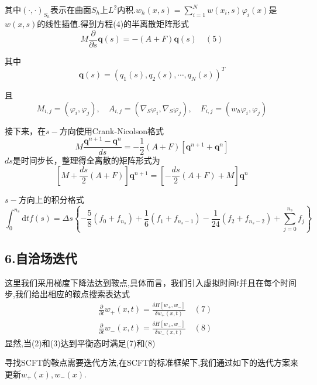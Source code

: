 \documentclass{article}
\begin{document}
其中$(\cdot,\cdot)_{S_h}$表示在曲面$S_h$上$L^2$内积.$w_h(x,s)=\sum\limits_{i=1}^Nw(x_i,s)\varphi_i(x)$是$w(x,s)$的线性插值.得到方程(4)的半离散矩阵形式
\begin{equation*}
M\frac{\partial}{\partial s}\boldsymbol{q}(s)=-(A+F)\boldsymbol{q}(s)\quad(5)
\end{equation*}

其中
\begin{equation*}
\boldsymbol{q}(s)=(q_1(s),q_2(s),\cdots,q_N(s))^T
\end{equation*}

且
\begin{equation*}
M_{i,j}=(\varphi_i,\varphi_j),\quad A_{i,j}=(\nabla_S\varphi_i,\nabla_S\varphi_j),\quad F_{i,j}=(w_h\varphi_i,\varphi_j)
\end{equation*}

接下来，在$s-$方向使用Crank-Nicolson格式
\begin{equation*}
M\frac{\boldsymbol{q}^{n+1}-\boldsymbol{q}^n}{ds}=-\frac{1}{2}(A+F)\left[\boldsymbol{q}^{n+1}+\boldsymbol{q}^n\right]
\end{equation*}
$ds$是时间步长，整理得全离散的矩阵形式为
\begin{equation*}
\left[M+\frac{ds}{2}(A+F)\right]\boldsymbol{q}^{n+1}=\left[-\frac{ds}{2}(A+F)+M\right]\boldsymbol{q}^n
\end{equation*}

$s-$方向上的积分格式
\begin{equation*}
\int_0^{n_s}\mathrm{d}tf(s)=\Delta s\left\{-\frac{5}{8}(f_0+f_{n_s})+\frac{1}{6}(f_1+f_{{n_s}-1})-\frac{1}{24}(f_2+f_{{n_s}-2})+\sum\limits_{j=0}^{n_s}f_j\right\}
\end{equation*}
\subsection{6.自洽场迭代}
这里我们采用梯度下降法达到鞍点,具体而言，我们引入虚拟时间$t$并且在每个时间步,我们给出相应的鞍点搜索表达式
\begin{equation*}
\begin{aligned}
&\frac{\partial}{\partial t}w_+(x,t)=\frac{\delta H[w_+,w_-]}{\delta w_+(x,t)}\quad(7)\\
&\frac{\partial}{\partial t}w_-(x,t)=\frac{\delta H[w_+,w_-]}{\delta w_-(x,t)}\quad(8)
\end{aligned}
\end{equation*}
显然,当(2)和(3)达到平衡态时满足(7)和(8)

寻找SCFT的鞍点需要迭代方法,在SCFT的标准框架下,我们通过如下的迭代方案来更新$w_+(x), w_-(x)$.
\end{document}
